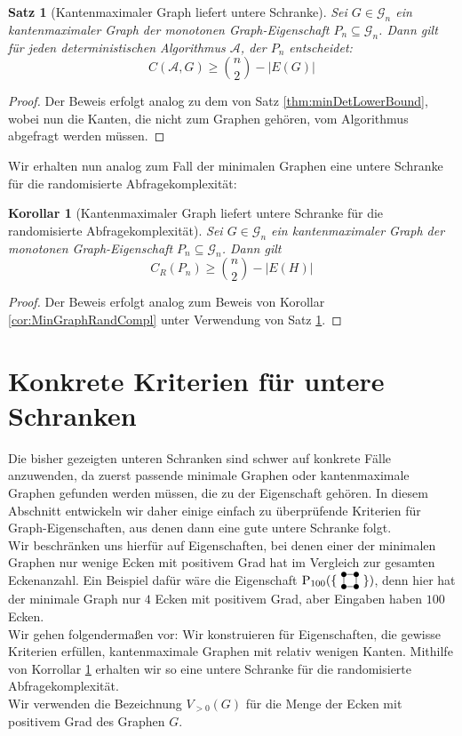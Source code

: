 \documentclass[a4paper]{scrreprt}
\newtheorem{Satz}[definition]{Satz}
\newtheorem{corollary}[definition]{Korollar}
\theoremstyle{definition}
\newcommand{\Square}{
\begin{tikzpicture}[main_node/.style={circle,fill=black},
inner sep=1.5pt, baseline=2pt]

    \node[main_node] (1) at (0,0) {};
    \node[main_node] (2) at (0.35, 0)  {};
    \node[main_node] (3) at (0.35, 0.35) {};
    \node[main_node] (4) at (0, 0.35) {};

    \draw (1) -- (2) -- (3) -- (4) -- (1);
\end{tikzpicture}
}
\begin{document}
\begin{Satz}[Kantenmaximaler Graph liefert untere Schranke]
\label{thm:EdgeMaxGraphLowerBound}
Sei $G\in \mathcal{G}_n$ ein kantenmaximaler Graph der monotonen
Graph-Eigenschaft $P_n \subseteq \mathcal{G}_n$.
Dann gilt für jeden deterministischen Algorithmus $\mathcal{A}$,
der $P_n$ entscheidet: 
$$ C(\mathcal{A}, G) \geq \binom{n}{2} - |E(G)| $$
\end{Satz}
\begin{proof}
Der Beweis erfolgt analog zu dem von Satz \ref{thm:minDetLowerBound},
wobei nun die Kanten, die nicht zum Graphen gehören, vom Algorithmus
abgefragt werden müssen.
\end{proof}
Wir erhalten nun analog zum Fall der minimalen Graphen eine untere
Schranke für die randomisierte Abfragekomplexität:
\begin{corollary} [Kantenmaximaler Graph liefert untere Schranke
für die randomisierte Abfragekomplexität]
\label{thm:EdgeMaximalRandCompl}
Sei $G\in\mathcal{G}_n$ ein kantenmaximaler Graph der monotonen
Graph-Eigenschaft $P_n \subseteq \mathcal{G}_n$.
Dann gilt
$$ C_R(P_n) \geq \binom{n}{2} - |E(H)| $$
\end{corollary}
\begin{proof}
Der Beweis erfolgt analog zum Beweis von Korollar \ref{cor:MinGraphRandCompl}
unter Verwendung von Satz \ref{thm:EdgeMaxGraphLowerBound}.
\end{proof}

\section{Konkrete Kriterien für untere Schranken}
Die bisher gezeigten unteren Schranken sind schwer auf konkrete
Fälle anzuwenden, da zuerst passende minimale Graphen oder kantenmaximale
Graphen gefunden werden müssen, die zu der Eigenschaft gehören.
In diesem Abschnitt entwickeln wir daher einige einfach zu überprüfende
Kriterien für Graph-Eigenschaften, aus denen dann eine gute
untere Schranke folgt. \\
Wir beschränken uns hierfür auf Eigenschaften, bei denen einer
der minimalen Graphen nur wenige Ecken mit positivem Grad hat
im Vergleich zur gesamten Eckenanzahl. Ein Beispiel dafür wäre
die Eigenschaft $\operatorname{P}_{100}(\{ \ \Square \ \})$,
denn hier hat der minimale Graph nur $4$ Ecken mit positivem
Grad, aber Eingaben haben $100$ Ecken. \\
Wir gehen folgendermaßen vor: Wir konstruieren für Eigenschaften,
die gewisse Kriterien erfüllen, kantenmaximale Graphen mit 
relativ wenigen Kanten. Mithilfe von Korrollar 
\ref{thm:EdgeMaximalRandCompl} erhalten wir so eine untere Schranke
für die randomisierte Abfragekomplexität. \\
Wir verwenden die Bezeichnung $V_{>0}(G)$ für die
Menge der Ecken mit positivem Grad des Graphen $G$.
\end{document}
